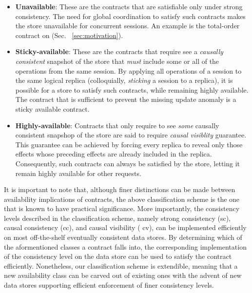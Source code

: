 \begin{itemize}
\item \textbf{Unavailable}: These are the contracts that are
satisfiable only under strong consistency. The need for global
coordination to satisfy such contracts makes the store unavailable for
concurrent sessions. An example is the total-order contract on
 (Sec. ~\ref{sec:motivation}).
\item \textbf{Sticky-available}: These are the contracts that require
see a \emph{causally consistent} snapshot of the store that
\emph{must} include some or all of the operations from the same
session. By applying all operations of a session to the same logical
replica (colloquially, \emph{sticking} a session to a replica), it is
possible for a store to satisfy such contracts, while remaining highly
available. The  contract that is sufficient to prevent
the missing update anomaly is a sticky available contract.
\item \textbf{Highly-available}: Contracts that only require to see
\emph{some} causally consistent snapshop of the store are said to
require \emph{causal visiblity} guarantee. This guarantee can be
achieved by forcing every replica to reveal only those effects whose
preceding effects are already included in the replica. Consequently,
such contracts can always be satisfied by the store, letting it remain
highly available for other requests.
\end{itemize}

It is important to note that, although finer distinctions can be made
between availability implications of contracts, the above
classification scheme is the one that is known to have practical
significance\cite{bailisHAT}. More importantly, the consistency levels
described in the classification scheme, namely strong consistency
({\sf sc}), causal consistency ({\sc cc}), and causal visibility ({\sf
cv}), can be implemented efficiently on most off-the-shelf eventually
consistent data stores\cite{...}. By determining which of the
aformentioned classes a contract falls into, the corresponding
implementation of the consistency level on the data store can be used
to satisfy the contract efficiently. Nonetheless, our classification
scheme is extendible, meaning that a new availability class can be
carved out of existing ones with the advent of new data stores
supporting efficient enforcement of finer consistency levels.

